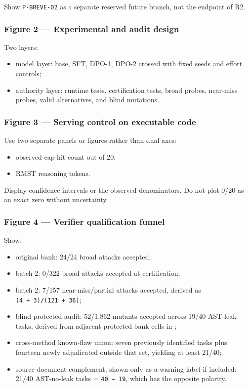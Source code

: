 \documentclass[
]{article}
\providecommand{\tightlist}{%
  \setlength{\itemsep}{0pt}\setlength{\parskip}{0pt}}
\begin{document}
Show \texttt{P-BREVE-02} as a separate reserved future branch, not the
endpoint of R2.

\subsubsection{Figure 2 --- Experimental and audit
design}\label{figure-2--experimental-and-audit-design}

Two layers:

\begin{itemize}
\tightlist
\item
  model layer: base, SFT, DPO-1, DPO-2 crossed with fixed seeds and
  effort controls;
\item
  authority layer: runtime tests, certification tests, broad probes,
  near-miss probes, valid alternatives, and blind mutations.
\end{itemize}

\subsubsection{Figure 3 --- Serving control on executable
code}\label{figure-3--serving-control-on-executable-code}

Use two separate panels or figures rather than dual axes:

\begin{itemize}
\tightlist
\item
  observed cap-hit count out of 20;
\item
  RMST reasoning tokens.
\end{itemize}

Display confidence intervals or the observed denominators. Do not plot
0/20 as an exact zero without uncertainty.

\subsubsection{Figure 4 --- Verifier qualification
funnel}\label{figure-4--verifier-qualification-funnel}

Show:

\begin{itemize}
\tightlist
\item
  original bank: 24/24 broad attacks accepted;
\item
  batch 2: 0/322 broad attacks accepted at certification;
\item
  batch 2: 7/157 near-miss/partial attacks accepted, derived as
  \texttt{(4\ +\ 3)/(121\ +\ 36)};
\item
  blind protected audit: 52/1,862 mutants accepted across 19/40 AST-leak
  tasks, derived from adjacent protected-bank cells in
  ;
\item
  cross-method known-flaw union: seven previously identified tasks plus
  fourteen newly adjudicated outside that set, yielding at least 21/40;
\item
  source-document complement, shown only as a warning label if included:
  21/40 AST-no-leak tasks = \texttt{40\ −\ 19}, which has the opposite
  polarity.
\end{itemize}
\end{document}
